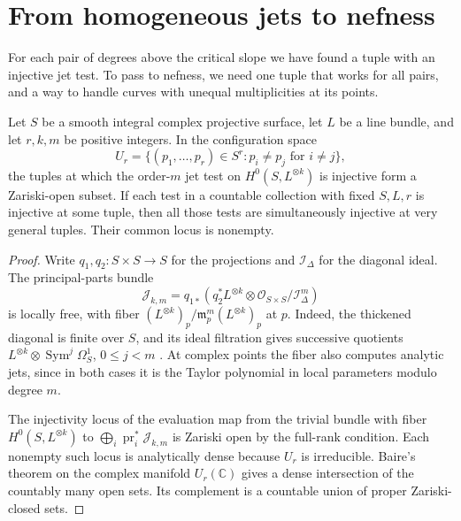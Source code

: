 \section{From homogeneous jets to nefness}\label{sec:nef}

For each pair of degrees above the critical slope we have found a tuple with an injective jet test. To pass to nefness, we need one tuple that works for all pairs, and a way to handle curves with unequal multiplicities at its points.

\begin{lemma}\label{lem:jet-open}
Let $S$ be a smooth integral complex projective surface, let $L$ be a line bundle, and let $r,k,m$ be positive integers. In the configuration space
\[
 U_r=\{(p_1,\ldots,p_r)\in S^r:p_i\ne p_j\text{ for }i\ne j\},
\]
the tuples at which the order-$m$ jet test on $H^0(S,L^{\otimes k})$ is injective form a Zariski-open subset. If each test in a countable collection with fixed $S,L,r$ is injective at some tuple, then all those tests are simultaneously injective at very general tuples. Their common locus is nonempty.
\end{lemma}

\begin{proof}
Write $q_1,q_2:S\times S\to S$ for the projections and $\mathcal I_\Delta$ for the diagonal ideal. The principal-parts bundle
\[
 \mathcal J_{k,m}=q_{1*}\!\left(q_2^*L^{\otimes k}\otimes
                      \mathcal O_{S\times S}/\mathcal I_\Delta^m\right)
\]
is locally free, with fiber $(L^{\otimes k})_p/\mathfrak m_p^m(L^{\otimes k})_p$ at $p$. Indeed, the thickened diagonal is finite over $S$, and its ideal filtration gives successive quotients $L^{\otimes k}\otimes\operatorname{Sym}^j\Omega_S^1$, $0\le j<m$ \cite[Tags \href{https://stacks.math.columbia.edu/tag/0G3P}{0G3P} and \href{https://stacks.math.columbia.edu/tag/0638}{0638}]{Stacks}. At complex points the fiber also computes analytic jets, since in both cases it is the Taylor polynomial in local parameters modulo degree $m$.

The injectivity locus of the evaluation map from the trivial bundle with fiber $H^0(S,L^{\otimes k})$ to $\bigoplus_i\operatorname{pr}_i^*\mathcal J_{k,m}$ is Zariski open by the full-rank condition. Each nonempty such locus is analytically dense because $U_r$ is irreducible. Baire's theorem on the complex manifold $U_r(\mathbb C)$ gives a dense intersection of the countably many open sets. Its complement is a countable union of proper Zariski-closed sets.
\end{proof}

